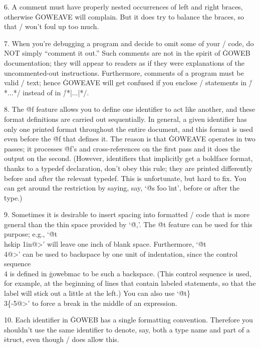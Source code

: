 6. A comment must have properly nested occurrences of left and right
braces, otherwise \.{GOWEAVE} will complain. But it
does try to balance the braces, so that \TEX/ won't foul up too much.

7. When you're debugging a program and decide to omit some of your
\GO/ code, do NOT simply ``comment it out.'' Such comments are not
in the spirit of \.{GOWEB} documentation; they will appear to readers
as if they were explanations of the uncommented-out instructions.
Furthermore, comments of a program must be valid \TEX/ text; hence
\.{GOWEAVE} will get confused if you enclose \GO/ statements in
\.{/*...*/} instead of in \.{/*|...|*/}. 

8. The \.{@f} feature allows you to define one identifier to act like
another, and these format definitions are carried out sequentially.
In general, a given identifier has only one printed format
throughout the entire document, and this format is used even before
the \.{@f} that defines it. The reason is that \.{GOWEAVE} operates in two
passes; it processes \.{@f}'s and cross-references on the first pass and
it does the output on the second.  (However, identifiers that
implicitly get a boldface format, thanks to a \.{typedef} declaration,
don't obey this rule; they are printed differently before and after
the relevant \.{typedef}.  This is unfortunate, but hard to fix. You can
get around the restriction by saying, say, `\.{@s} \.{foo} \.{int}',
before or after the \.{type}.)

9. Sometimes it is desirable to insert spacing into formatted \GO/ code that
is more general than the thin space provided by `\.{@,}'. The \.{@t} feature
can be used for this purpose; e.g., `\.{@t\\hskip 1in@>}' will
leave one inch of blank space. Furthermore, `\.{@t\\4@>}' can be
used to backspace by one unit of indentation, since the control sequence
\.{\\4} is defined in \.{gowebmac} to be such a backspace. (This
control sequence is used, for example, at the beginning of lines that
contain labeled statements, so that the label will stick out a little at
the left.) You can also use `\.{@t\}\\3\{-5@>}' to force a break
in the middle of an expression.

10. Each identifier in \.{GOWEB} has a single formatting convention. Therefore
you shouldn't use the same identifier to denote, say, both a type name and
part of a \.{struct}, even though \GO/ does allow this.

